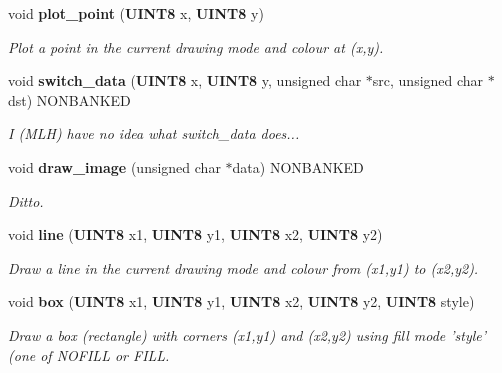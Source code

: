 \begin{CompactItemize}
\item 
\label{drawing.h_a19}
void {\bf plot\_\-point} ({\bf UINT8} x, {\bf UINT8} y)
\begin{CompactList}\small\item\em Plot a point in the current drawing mode and colour at (x,y).\item\end{CompactList}

\item 
\label{drawing.h_a20}
void {\bf switch\_\-data} ({\bf UINT8} x, {\bf UINT8} y, unsigned char $\ast$src, unsigned char $\ast$dst) NONBANKED
\begin{CompactList}\small\item\em I (MLH) have no idea what switch\_\-data does...\item\end{CompactList}

\item 
\label{drawing.h_a21}
void {\bf draw\_\-image} (unsigned char $\ast$data) NONBANKED
\begin{CompactList}\small\item\em Ditto.\item\end{CompactList}

\item 
\label{drawing.h_a22}
void {\bf line} ({\bf UINT8} x1, {\bf UINT8} y1, {\bf UINT8} x2, {\bf UINT8} y2)
\begin{CompactList}\small\item\em Draw a line in the current drawing mode and colour from (x1,y1) to (x2,y2).\item\end{CompactList}

\item 
\label{drawing.h_a23}
void {\bf box} ({\bf UINT8} x1, {\bf UINT8} y1, {\bf UINT8} x2, {\bf UINT8} y2, {\bf UINT8} style)
\begin{CompactList}\small\item\em Draw a box (rectangle) with corners (x1,y1) and (x2,y2) using fill mode 'style' (one of NOFILL or FILL.\item\end{CompactList}


\end{CompactItemize}
